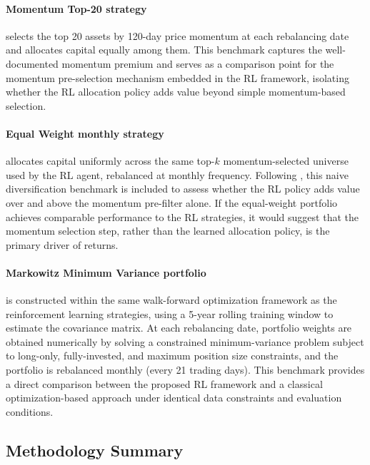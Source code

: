 \documentclass[]{elsarticle}
\begin{document}
\paragraph{Momentum Top-20 strategy}  selects the top 20 assets by 120-day price momentum at each rebalancing date and allocates capital equally among them. This benchmark captures the well-documented momentum premium and serves as a comparison point for the momentum pre-selection mechanism embedded in the RL framework, isolating whether the RL allocation policy adds value beyond simple momentum-based selection.

\paragraph{Equal Weight monthly strategy}  allocates capital uniformly across the same top-$k$ momentum-selected universe used by the RL agent, rebalanced at monthly frequency. Following \citet{DE_MIGEUL}, this naive diversification benchmark is included to assess whether the RL policy adds value over and above the momentum pre-filter alone. If the equal-weight portfolio achieves comparable performance to the RL strategies, it would suggest that the momentum selection step, rather than the learned allocation policy, is the primary driver of returns.

\paragraph {Markowitz Minimum Variance portfolio} is constructed within the same walk-forward optimization framework as the reinforcement learning strategies, using a 5-year rolling training window to estimate the covariance matrix. At each rebalancing date, portfolio weights are obtained numerically by solving a constrained minimum-variance problem subject to long-only, fully-invested, and maximum position size constraints, and the portfolio is rebalanced monthly (every 21 trading days). This benchmark provides a direct comparison between the proposed RL framework and a classical optimization-based approach under identical data constraints and evaluation conditions.

\hypertarget{Methodology-Summary}{%
\subsection{Methodology Summary}\label{Methodology-Summary}}
\end{document}
